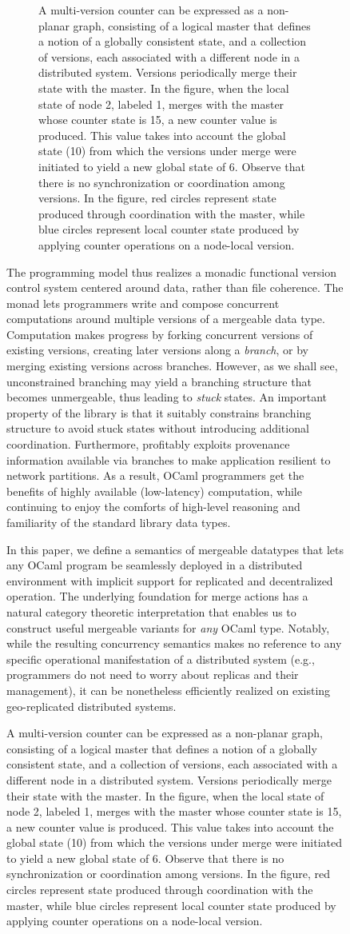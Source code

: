 \begin{figure}
\begin{figure}
\begin{center}
  \end{center}
  \caption{\small A multi-version counter can be expressed as a
    non-planar graph, consisting of a logical master that defines a
    notion of a globally consistent state, and a collection of
    versions, each associated with a different node in a distributed
    system.  Versions periodically merge their state with the master.
    In the figure, when the local state of node 2, labeled 1, merges
    with the master whose counter state is 15, a new counter value is
    produced.  This value takes into account the global state (10)
    from which the versions under merge were initiated to yield a new
    global state of 6.  Observe that there is no synchronization or
    coordination among versions.  In the figure, red circles represent
    state produced through coordination with the master, while blue
    circles represent local counter state produced by applying counter
    operations on a node-local version.  }
\end{figure}

The \name programming model thus realizes a monadic functional version
control system centered around data, rather than file coherence.  The
\name monad lets programmers write and compose concurrent computations
around multiple versions of a mergeable data type.  Computation makes
progress by forking concurrent versions of existing versions, creating
later versions along a \emph{branch}, or by merging existing versions
across branches. However, as we shall see, unconstrained branching may
yield a branching structure that becomes unmergeable, thus leading to
\emph{stuck} states. An important property of the \name library is
that it suitably constrains branching structure to avoid stuck states
without introducing additional coordination.  Furthermore, \name
profitably exploits provenance information available via branches to
make application resilient to network partitions.  As a result, OCaml
programmers get the benefits of highly available (low-latency)
computation, while continuing to enjoy the comforts of high-level
reasoning and familiarity of the standard library data types.

In this paper, we define a semantics of mergeable datatypes that lets
any OCaml program be seamlessly deployed in a distributed environment
with implicit support for replicated and decentralized operation.  The
underlying foundation for merge actions has a natural category
theoretic interpretation that enables us to construct useful mergeable
variants for \emph{any} OCaml type.  Notably, while the resulting
concurrency semantics makes no reference to any specific operational
manifestation of a distributed system (e.g., programmers do not need
to worry about replicas and their management), it can be nonetheless
efficiently realized on existing geo-replicated distributed systems.


\end{figure}
